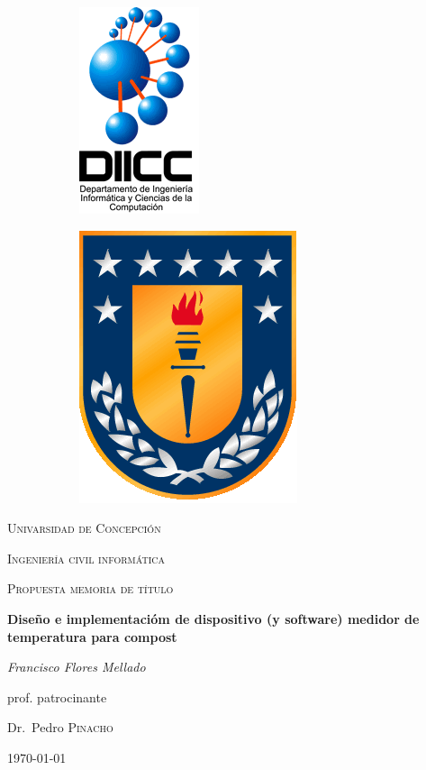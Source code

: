 \documentclass[12pt, letterpaper]{article}
\begin{document}
\begin{titlepage}
	\begin{figure}
		
		\begin{subfigure}[b]{0.5\textwidth}
			\includegraphics[scale=0.45]{figures/diicc.png}
		\end{subfigure}
		\hfill
		\begin{subfigure}[b]{0.1\textwidth}
			\includegraphics[scale=0.4]{figures/escudo_udec.png}
		\end{subfigure}
	\end{figure}
	
	\centering	
	\par\vspace{1cm}
	{\scshape\LARGE Univarsidad de Concepción \par}
	{\scshape Ingeniería civil informática \par}
	\vspace{1cm}
	{\scshape\Large Propuesta memoria de título\par}
	\vspace{1.5cm}
	{\huge\bfseries Diseño e implementacióm de dispositivo (y software) medidor de temperatura para compost\par}
	\vspace{2cm}
	{\Large\itshape Francisco Flores Mellado\par}
	\vfill
	prof. patrocinante\par
	Dr.~Pedro \textsc{Pinacho}

	\vfill

	{\large \today\par}
\end{titlepage}
\end{document}
